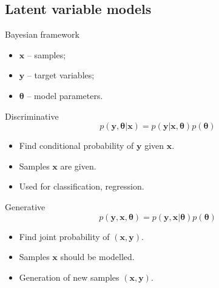 \documentclass{beamer}
\newcommand{\bx}{\mathbf{x}}
\newcommand{\by}{\mathbf{y}}
\newcommand{\btheta}{\boldsymbol{\theta}}
\begin{document}
\subsection{Latent variable models}
\begin{frame}{Bayesian framework}
\begin{itemize}
    \item $\bx$ -- samples;
    \item $\by$ -- target variables;
    \item $\btheta$ -- model parameters.
\end{itemize}
\begin{minipage}[t]{0.5\columnwidth}
\begin{block}{Discriminative}
    \[
        p(\by, \btheta | \bx) = p(\by | \bx, \btheta) p(\btheta)
    \]
    \begin{itemize}
        \item Find conditional probability of $\by$ given $\bx$. \\
        \item Samples $\bx$ are given. \\
        \item Used for classification, regression.
    \end{itemize}
\end{block}
\end{minipage}%
\begin{minipage}[t]{0.5\columnwidth}
\begin{block}{Generative}
    \[
        p(\by, \bx, \btheta) = p(\by, \bx | \btheta) p(\btheta)
    \]
    \begin{itemize}
        \item Find joint probability of $(\bx, \by)$.
        \item Samples $\bx$ should be modelled. \\
        \item Generation of new samples $(\bx, \by)$.
    \end{itemize}
\end{block}
\end{minipage}
\end{frame}
\end{document}
